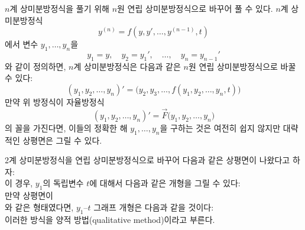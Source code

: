 \documentclass[../engineering_mathematics_lecture_note.tex]{subfiles}
\begin{document}
$n$계 상미분방정식을 풀기 위해 $n$원 연립 상미분방정식으로 바꾸어 풀 수 있다.
$n$계 상미분방정식
\begin{equation*}
    y^{(n)} = f \left( y, y', \dots, y^{(n - 1)}, t \right)
\end{equation*}
에서 변수 $y_1, \dots, y_n$을
\begin{equation*}
    y_1 = y,\quad y_2 = y_1',\quad \dots,\quad y_n = y_{n - 1}'
\end{equation*}
와 같이 정의하면, $n$계 상미분방정식은 다음과 같은 $n$원 연립 상미분방정식으로 바꿀 수 있다:
\begin{equation*}
    (y_1, y_2, \dots, y_n)' = \bigl(y_2, y_3, \dots, f(y_1, y_2, \dots, y_n, t)\bigr)
\end{equation*}
만약 위 방정식이 자율방정식
\begin{equation*}
    (y_1, y_2, \dots, y_n)' = \vec F \bigl(y_1, y_2, \dots, y_n\bigr)
\end{equation*}
의 꼴을 가진다면, 이들의 정확한 해 $y_1, \dots, y_n$을 구하는 것은 여전히 쉽지 않지만 대략적인 상평면은 그릴 수 있다.

\begin{example}
    2계 상미분방정식을 연립 상미분방정식으로 바꾸어 다음과 같은 상평면이 나왔다고 하자:\\
    이 경우, $y_1$의 독립변수 $t$에 대해서 다음과 같은 개형을 그릴 수 있다:\\

    만약 상평면이\\
    와 같은 형태였다면, $y_1$--$t$ 그래프 개형은 다음과 같을 것이다:\\
    이러한 방식을 양적 방법(qualitative method)이라고 부른다.
\end{example}
\end{document}
